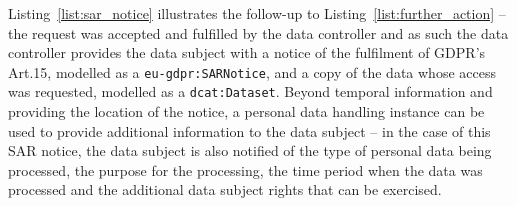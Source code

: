 
Listing~\ref{list:sar_notice} illustrates the follow-up to Listing~\ref{list:further_action} -- the request was accepted and fulfilled by the data controller and as such the data controller provides the data subject with a notice of the fulfilment of GDPR's Art.15, modelled as a \texttt{eu-gdpr:SARNotice}, and a copy of the data whose access was requested, modelled as a \texttt{dcat:Dataset}.
Beyond temporal information and providing the location of the notice, a personal data handling instance can be used to provide additional information to the data subject -- in the case of this SAR notice, the data subject is also notified of the type of personal data being processed, the purpose for the processing, the time period when the data was processed and the additional data subject rights that can be exercised.

